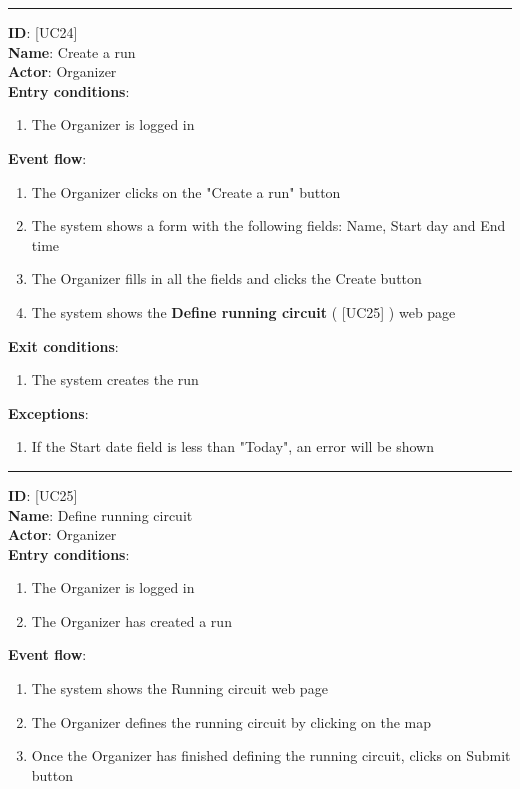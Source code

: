 \documentclass[12pt]{article}
\newcommand\usecase[1]{ [UC#1] }
\begin{document}
\begin{itemize}
  	\rule{\linewidth}{0.4pt}
  	\textbf{ID}: \usecase{24} \\
  	\textbf{Name}: Create a run \\
    \textbf{Actor}: Organizer \\
    \textbf{Entry conditions}: 
    		\begin{enumerate}
    			\item{The Organizer is logged in}
    		\end{enumerate}
  	\textbf{Event flow}:
  		\begin{enumerate}
    			\item{The Organizer clicks on the "Create a run" button}
    			\item{The system shows a form with the following fields: Name, Start day and End time}
    			\item{The Organizer fills in all the fields and clicks the Create button}
    			\item{The system shows the \textbf{Define running circuit} (\usecase{25}) web page}
  		\end{enumerate}
  	\textbf{Exit conditions}:
  		\begin{enumerate}
    			\item{The system creates the run}
  		\end{enumerate}
  	\textbf{Exceptions}:
  		\begin{enumerate}
  			\item{If the Start date field is less than "Today", an error will be shown}
  		\end{enumerate}
  	\rule{\linewidth}{0.4pt}
  	\textbf{ID}: \usecase{25} \\
  	\textbf{Name}: Define running circuit \\
    \textbf{Actor}: Organizer \\
    \textbf{Entry conditions}: 
    		\begin{enumerate}
    			\item{The Organizer is logged in}
    			\item{The Organizer has created a run}
    		\end{enumerate}
  	\textbf{Event flow}:
  		\begin{enumerate}
    			\item{The system shows the Running circuit web page}
    			\item{The Organizer defines the running circuit by clicking on the map}
    			\item{Once the Organizer has finished defining the running circuit, clicks on Submit button}

\end{enumerate}
\end{itemize}
\end{document}
